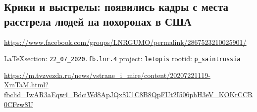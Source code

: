  
 
\subsection{Крики и выстрелы: появились кадры с места расстрела людей на похоронах в США}
\url{https://www.facebook.com/groups/LNRGUMO/permalink/2867523210025901/}
  
\vspace{0.5cm}
{\small\LaTeX section: \verb|22_07_2020.fb.lnr.4| project: \verb|letopis| rootid: \verb|p_saintrussia|}
\vspace{0.5cm}

\url{https://m.tvzvezda.ru/news/vstrane_i_mire/content/20207221119-XmTaM.html?fbclid=IwAR3aEqw4_BdciWd8ApJQx8U1C8B8QpFUt2I506phH3eV_KOKrCCR0CFzw8U}
  
